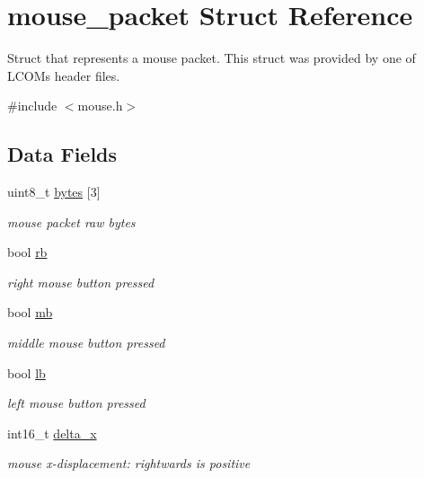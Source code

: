 \hypertarget{structmouse__packet}{}\section{mouse\+\_\+packet Struct Reference}
\label{structmouse__packet}


Struct that represents a mouse packet. This struct was provided by one of L\+C\+OM\textquotesingle{}s header files.  




{\ttfamily \#include $<$mouse.\+h$>$}

\subsection*{Data Fields}
\begin{DoxyCompactItemize}
\item 
uint8\+\_\+t \hyperlink{structmouse__packet_a89fe01e2d4cf73b27993d65029aff235}{bytes} \mbox{[}3\mbox{]}
\begin{DoxyCompactList}\small\item\em mouse packet raw bytes \end{DoxyCompactList}\item 
bool \hyperlink{structmouse__packet_abbf74dbbb9f15eefcd8500a92e0d9385}{rb}
\begin{DoxyCompactList}\small\item\em right mouse button pressed \end{DoxyCompactList}\item 
bool \hyperlink{structmouse__packet_ae010190682edcfeb246d109ff3d4d7ba}{mb}
\begin{DoxyCompactList}\small\item\em middle mouse button pressed \end{DoxyCompactList}\item 
bool \hyperlink{structmouse__packet_a2cc1266e0b4b2162696a91f235034271}{lb}
\begin{DoxyCompactList}\small\item\em left mouse button pressed \end{DoxyCompactList}\item 
int16\+\_\+t \hyperlink{structmouse__packet_ada6da69ab3d4f4b471ffe88827e8754c}{delta\+\_\+x}
\begin{DoxyCompactList}\small\item\em mouse x-\/displacement\+: rightwards is positive \end{DoxyCompactList}\item 

\end{DoxyCompactItemize}
